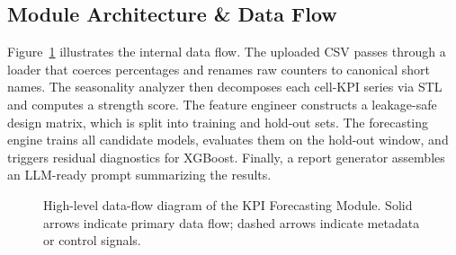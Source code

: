 \subsection{Module Architecture \& Data Flow}

Figure~\ref{fig:architecture} illustrates the internal data flow. The uploaded CSV passes through a loader that coerces percentages and renames raw counters to canonical short names. The seasonality analyzer then decomposes each cell-KPI series via STL and computes a strength score. The feature engineer constructs a leakage-safe design matrix, which is split into training and hold-out sets. The forecasting engine trains all candidate models, evaluates them on the hold-out window, and triggers residual diagnostics for XGBoost. Finally, a report generator assembles an LLM-ready prompt summarizing the results.

\begin{figure}[H]
    \centering
    \caption{High-level data-flow diagram of the KPI Forecasting Module. Solid arrows indicate primary data flow; dashed arrows indicate metadata or control signals.}
    \label{fig:architecture}
\end{figure}


